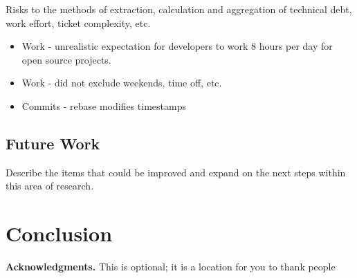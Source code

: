 \documentclass{mpaper}
\begin{document}
Risks to the methods of extraction, calculation and aggregation of technical
debt, work effort, ticket complexity, etc.

\begin{itemize}
  \item Work - unrealistic expectation for developers to work 8 hours per day
  for open source projects.
  \item Work - did not exclude weekends, time off, etc.
  \item Commits - rebase modifies timestamps
\end{itemize}

\subsection{Future Work}
\label{future-work}

Describe the items that could be improved and expand on the next steps within
this area of research.

\section{Conclusion}
\label{conclusion}

{\bf Acknowledgments.} This is optional; it is a location for you to thank
people



\end{document}
